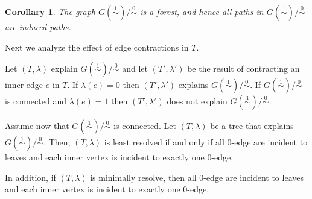 \documentclass[smallextended]{svjour3}
\newcommand{\rev}[1]{\begingroup\color{blue}#1\endgroup}
\newcommand{\Ro}{\mathrel{\overset{0}{\sim}}}
\newcommand{\Rl}{\mathrel{\overset{1}{\sim}}}
\newtheorem{cor}[thm]{Corollary}
\begin{document}
\begin{cor}
  The graph $G(\Rl)/\Ro$ is a forest, and hence all paths in $G(\Rl)/\Ro$
  are induced paths.
  \label{cor:cycle-free}
\end{cor}

Next we analyze the effect of edge contractions in $T$.

\begin{lemma} \label{lem:contract}
  Let $(T,\lambda)$ explain $G(\Rl)/\Ro$ and let $(T',\lambda')$ be the
  result of contracting an \rev{inner} edge  $e$ in $T$. If $\lambda(e)=0$
  then $(T',\lambda')$ explains $G(\Rl)/\Ro$. If $G(\Rl)/\Ro$ is connected
  and $\lambda(e)=1$ then $(T',\lambda')$ does not explain $G(\Rl)/\Ro$.

\rev{	Assume now that $G(\Rl)/\Ro$ %
		is connected. 
		Let $(T,\lambda)$ be a tree that explains $G(\Rl)/\Ro$. 
      Then, $(T,\lambda)$  is \rev{least resolved} if and only if
      all 0-edge are incident to leaves and each inner vertex 
	   is incident to exactly one 0-edge.

		In addition,  if $(T,\lambda)$ 
		is minimally resolve, then    all 0-edge are incident to leaves
		and each inner vertex 
	   is incident to exactly one 0-edge.
}
\end{lemma}
\end{document}
